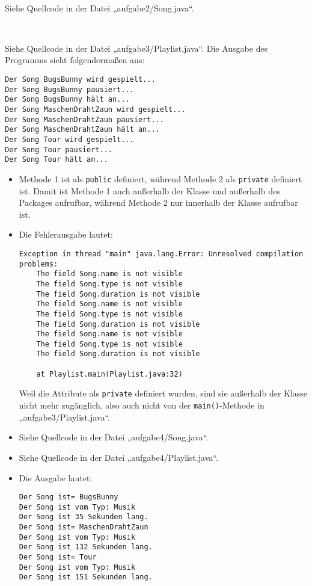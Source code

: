 \documentclass{mywork}
\begin{document}
\setcounter{aufgabe}{1}

\begin{aufgabe}~

	Siehe Quellcode in der Datei „aufgabe2/Song.java“.
\end{aufgabe}

\begin{aufgabe}~

	Siehe Quellcode in der Datei „aufgabe3/Playlist.java“.
	Die Ausgabe des Programms sieht folgendermaßen aus:
	\begin{verbatim}
Der Song BugsBunny wird gespielt...
Der Song BugsBunny pausiert...
Der Song BugsBunny hält an...
Der Song MaschenDrahtZaun wird gespielt...
Der Song MaschenDrahtZaun pausiert...
Der Song MaschenDrahtZaun hält an...
Der Song Tour wird gespielt...
Der Song Tour pausiert...	
Der Song Tour hält an...
	\end{verbatim}
\end{aufgabe}

\begin{aufgabe}
	\begin{itemize}
		\item
			Methode 1 ist als \verb|public| definiert, während Methode 2 als \verb|private| definiert ist.
			Damit ist Methode 1 auch außerhalb der Klasse und außerhalb des Packages aufrufbar, während Methode 2 nur innerhalb der Klasse aufrufbar ist.
		\item
			Die Fehlerausgabe lautet:
			\begin{verbatim}
Exception in thread "main" java.lang.Error: Unresolved compilation problems: 
	The field Song.name is not visible
	The field Song.type is not visible
	The field Song.duration is not visible
	The field Song.name is not visible
	The field Song.type is not visible
	The field Song.duration is not visible
	The field Song.name is not visible
	The field Song.type is not visible
	The field Song.duration is not visible

	at Playlist.main(Playlist.java:32)	
			\end{verbatim}
			Weil die Attribute als \verb|private| definiert wurden, sind sie außerhalb der Klasse nicht mehr zugänglich, also auch nicht von der \verb|main()|-Methode in „aufgabe3/Playlist.java“.
		\item
			Siehe Quellcode in der Datei „aufgabe4/Song.java“.
		\item
			Siehe Quellcode in der Datei „aufgabe4/Playlist.java“.
		\item
			Die Ausgabe lautet:
			\begin{verbatim}
Der Song ist= BugsBunny
Der Song ist vom Typ: Musik
Der Song ist 35 Sekunden lang.
Der Song ist= MaschenDrahtZaun
Der Song ist vom Typ: Musik
Der Song ist 132 Sekunden lang.
Der Song ist= Tour
Der Song ist vom Typ: Musik
Der Song ist 151 Sekunden lang.	
			\end{verbatim}
	\end{itemize}
\end{aufgabe}
\end{document}
